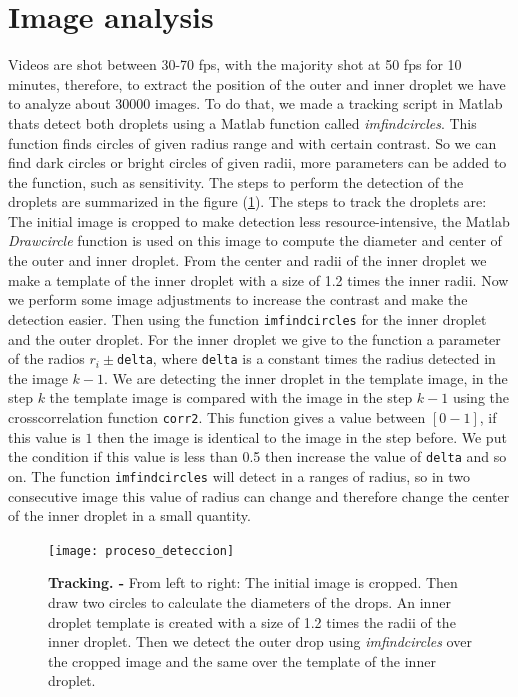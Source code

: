 \documentclass[%
10pt,
superscriptaddress,
twocolumn,
 amsmath,amssymb,
 aps,prx,
]{revtex4-2}
\begin{document}
\section{Image analysis}
\label{img.analisis}
Videos are shot between 30-70 fps, with the majority shot at 50 fps for 10 minutes, therefore, to extract the position of the outer and inner droplet we have to analyze about 30000 images. 
To do that, we made a tracking script in Matlab thats detect both droplets using a Matlab function  called \textit{imfindcircles}. This function finds circles of given radius range and with certain contrast. 
So we can find dark circles or bright circles of given radii, more parameters can be added to the function, such as sensitivity. The steps to perform the detection of the droplets are summarized in the figure (\ref{Deteccion}). The steps to track the droplets  are: The initial image is cropped  to make detection less resource-intensive, the Matlab \textit{Drawcircle} function is used on this image  to compute the diameter and center of the outer and inner  droplet. From the center and radii of the inner droplet we make a template of the inner droplet with a size of  1.2 times the  inner radii. Now we perform some image adjustments to increase the contrast  and  make the detection easier.  Then using the function \texttt{imfindcircles} for the inner droplet and the outer droplet. For the inner droplet we give to the function a parameter of the radios  $r_{i} \pm$\texttt{delta}, where \texttt{delta} is a constant times the radius detected in the image $k-1$.  We are detecting the inner droplet in the template image, in the step $k$ the template image is compared with the image in the step $k-1$ using the crosscorrelation function \texttt{corr2}.   This function gives a value between $[0-1]$, if this value is $1$ then the image is identical to the image  in the step before. We put the condition if this value is less than 0.5 then increase the value of  \texttt{delta} and so on. The function \texttt{imfindcircles} will detect in a ranges of radius, so in two consecutive image this value of radius can change and therefore change the center of the inner droplet in a small quantity. 

\begin{figure}[b!]
  \texttt{[image: proceso\_deteccion]}	
  \caption[Detection]{
    \textbf{Tracking. -} 
    From left to right: The initial image is cropped.  
    Then draw two circles to calculate the diameters of the drops. 
    An inner droplet template is created with a size of 1.2 times the radii of the inner droplet. 
    Then we detect the outer drop using \textit{imfindcircles} over the cropped image and the same over the template of the inner droplet.   
    }
		\label{Deteccion}
\end{figure}
\end{document}
